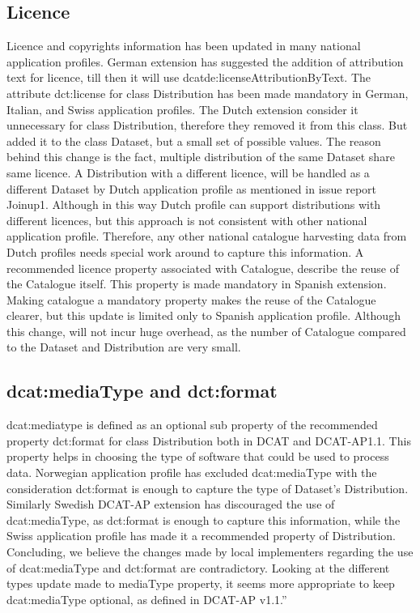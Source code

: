 \documentclass[<options>]{elsarticle}
\begin{document}
\subsection{Licence}
Licence and copyrights information has been updated in many national application profiles. German extension has suggested the addition of attribution text for licence, till then it will use dcatde:licenseAttributionByText. The attribute dct:license for class Distribution has been made mandatory in German, Italian, and Swiss application profiles. The Dutch extension consider it unnecessary for class Distribution, therefore they removed it from this class. But added it to the class Dataset, but a small set of possible values. The reason behind this change is the fact, multiple distribution of the same Dataset share same licence. A Distribution with a different licence, will be handled as a different Dataset by Dutch application profile as mentioned in issue report Joinup1. Although in this way Dutch profile can support distributions with different licences, but this approach is not consistent with other national application profile. Therefore, any other national catalogue harvesting data from Dutch profiles needs special work around to capture this information. 
A recommended licence property associated with Catalogue, describe the reuse of the Catalogue itself.  This property is made mandatory in Spanish extension. Making catalogue a mandatory property makes the reuse of the Catalogue clearer, but this update is limited only to Spanish application profile. Although this change, will not incur huge overhead, as the number of Catalogue compared to the Dataset and Distribution are very small.

\subsection{dcat:mediaType and dct:format}
dcat:mediatype is defined as an optional sub property of the recommended property dct:format for class Distribution both in DCAT and DCAT-AP1.1. This property helps in choosing the type of software that could be used to process data. Norwegian application profile has excluded dcat:mediaType with the consideration dct:format is enough to capture the type of Dataset’s Distribution. Similarly Swedish DCAT-AP extension has discouraged the use of dcat:mediaType, as dct:format is enough to capture this information, while the Swiss application profile has made it a recommended property of Distribution. Concluding, we believe the changes made by local implementers regarding the use of dcat:mediaType and dct:format are contradictory. Looking at the different types update made to mediaType property, it seems more appropriate to keep dcat:mediaType optional, as defined in DCAT-AP v1.1.”
\end{document}
